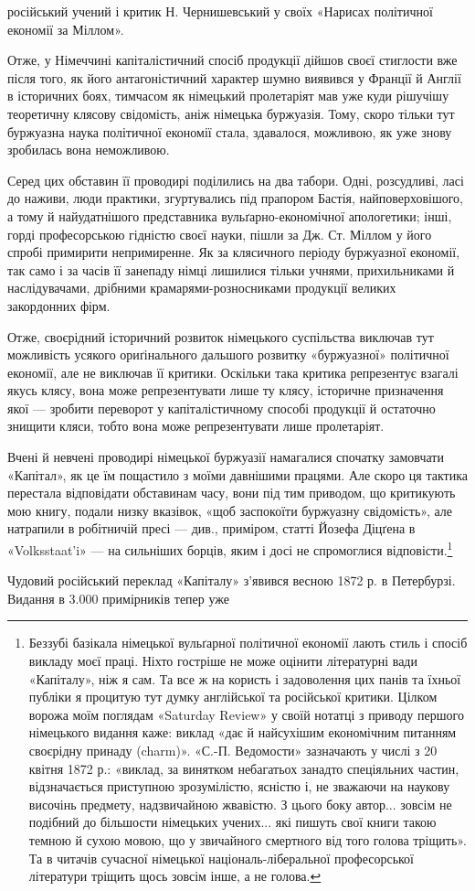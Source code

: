 \parcont{}  %
російський учений і критик Н. Чернишевський у своїх «Нарисах
політичної економії за Міллом».

Отже, у Німеччині капіталістичний спосіб продукції дійшов
своєї стиглости вже після того, як його антагоністичний характер
шумно виявився у Франції й Англії в історичних боях, тимчасом
як німецький пролетаріят мав уже куди рішучішу теоретичну
клясову свідомість, аніж німецька буржуазія. Тому, скоро тільки
тут буржуазна наука політичної економії стала, здавалося, можливою,
як уже знову зробилась вона неможливою.

Серед цих обставин її проводирі поділились на два табори.
Одні, розсудливі, ласі до наживи, люди практики, згуртувались
під прапором Бастія, найповерховішого, а тому й найудатнішого
представника вульґарно-економічної апологетики; інші, горді
професорською гідністю своєї науки, пішли за Дж. Ст. Міллом у
його спробі примирити непримиренне. Як за клясичного періоду
буржуазної економії, так само і за часів її занепаду німці лишилися
тільки учнями, прихильниками й наслідувачами, дрібними
крамарями-розносниками продукції великих закордонних фірм.

Отже, своєрідний історичний розвиток німецького суспільства
виключав тут можливість усякого ориґінального дальшого розвитку
«буржуазної» політичної економії, але не виключав її
критики. Оскільки така критика репрезентує взагалі якусь клясу,
вона може репрезентувати лише ту клясу, історичне призначення
якої — зробити переворот у капіталістичному способі продукції
й остаточно знищити кляси, тобто вона може репрезентувати лише
пролетаріят.

Вчені й невчені проводирі німецької буржуазії намагалися
спочатку замовчати «Капітал», як це їм пощастило з моїми давнішими
працями. Але скоро ця тактика перестала відповідати
обставинам часу, вони під тим приводом, що критикують мою
книгу, подали низку вказівок, «щоб заспокоїти буржуазну свідомість»,
але натрапили в робітничій пресі — див., приміром,
статті Йозефа Діцґена в «Volksstaat’i» — на сильніших борців,
яким і досі не спромоглися відповісти.\footnote{
Беззубі базікала німецької вульґарної політичної економії лають
стиль і спосіб викладу моєї праці. Ніхто гостріше не може оцінити літературні
вади «Капіталу», ніж я сам. Та все ж на користь і задоволення
цих панів та їхньої публіки я процитую тут думку англійської та російської
критики. Цілком ворожа моїм поглядам «Saturday Review» у своїй
нотатці з приводу першого німецького видання каже: виклад «дає й
найсухішим економічним питанням своєрідну принаду (charm)». «С.-П.
Ведомости» зазначають у числі з 20 квітня 1872 р.: «виклад, за винятком
небагатьох занадто спеціяльних частин, відзначається приступною зрозумілістю,
ясністю і, не зважаючи на наукову височінь предмету, надзвичайною
жвавістю. З цього боку автор... зовсім не подібний до більшости
німецьких учених... які пишуть свої книги такою темною й сухою мовою,
що у звичайного смертного від того голова тріщить». Та в читачів сучасної
німецької національ-ліберальної професорської літератури тріщить
щось зовсім інше, а не голова.
}

Чудовий російський переклад «Капіталу» з’явився весною
1872 р. в Петербурзі. Видання в 3.000 примірників тепер уже
\parbreak{}  %
